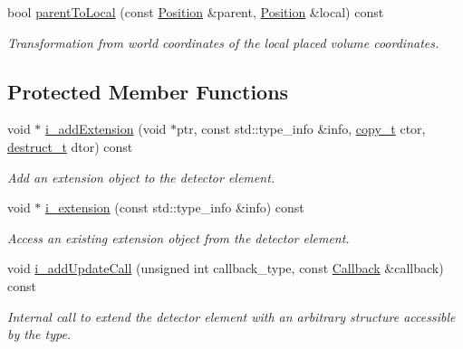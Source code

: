 \begin{DoxyCompactItemize}
bool \hyperlink{class_d_d4hep_1_1_geometry_1_1_det_element_ab9b7683dd7471ffb6195570d5c618a28}{parentToLocal} (const \hyperlink{namespace_d_d4hep_1_1_geometry_a55083902099d03506c6db01b80404900}{Position} \&parent, \hyperlink{namespace_d_d4hep_1_1_geometry_a55083902099d03506c6db01b80404900}{Position} \&local) const 
\begin{DoxyCompactList}\small\item\em Transformation from world coordinates of the local placed volume coordinates. \item\end{DoxyCompactList}\end{DoxyCompactItemize}
\subsection*{Protected Member Functions}
\begin{DoxyCompactItemize}
\item 
void $\ast$ \hyperlink{class_d_d4hep_1_1_geometry_1_1_det_element_a5efc4a0c2d1b0cf6e7d68406d795723f}{i\_\-addExtension} (void $\ast$ptr, const std::type\_\-info \&info, \hyperlink{class_d_d4hep_1_1_geometry_1_1_det_element_ad7efc067c799c81da218e8e153fb9fc9}{copy\_\-t} ctor, \hyperlink{class_d_d4hep_1_1_geometry_1_1_det_element_abeb83026451009f114bf84c285aec3c7}{destruct\_\-t} dtor) const 
\begin{DoxyCompactList}\small\item\em Add an extension object to the detector element. \item\end{DoxyCompactList}\item 
void $\ast$ \hyperlink{class_d_d4hep_1_1_geometry_1_1_det_element_a45f86dc46aa21a9466c2b1270029bfd2}{i\_\-extension} (const std::type\_\-info \&info) const 
\begin{DoxyCompactList}\small\item\em Access an existing extension object from the detector element. \item\end{DoxyCompactList}\item 
void \hyperlink{class_d_d4hep_1_1_geometry_1_1_det_element_adc63245333efeee5af537619b0cb8dec}{i\_\-addUpdateCall} (unsigned int callback\_\-type, const \hyperlink{class_d_d4hep_1_1_callback}{Callback} \&callback) const 
\begin{DoxyCompactList}\small\item\em Internal call to extend the detector element with an arbitrary structure accessible by the type. \item\end{DoxyCompactList}\end{DoxyCompactItemize}
